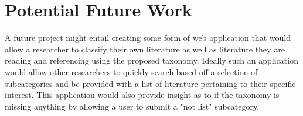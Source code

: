 \section{Potential Future Work}
A future project might entail creating some form of web application that would allow a researcher to classify their own literature as well as literature they are reading and referencing using the proposed taxonomy. 
Ideally such an application would allow other researchers to quickly search based off a selection of subcategories and be provided with a list of literature pertaining to their specific interest. 
This application would also provide insight as to if the taxonomy is missing anything by allowing a user to submit a "not list" subcategory.